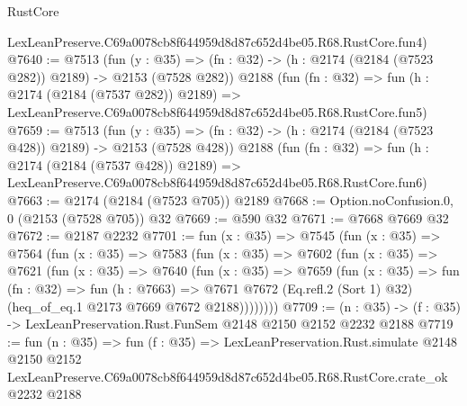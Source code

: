 \begin{lexlean}{RustCore}
\begin{coremodule}
    LexLeanPreserve.C69a0078cb8f644959d8d87c652d4be05.R68.RustCore.fun4)
@7640 := @7513
    (fun (y : @35) => (fn : @32) -> (h : @2174 (@2184 (@7523 @282)) @2189) -> @2153 (@7528 @282))
    @2188
    (fun (fn : @32) =>
    fun (h : @2174 (@2184 (@7537 @282)) @2189) =>
    LexLeanPreserve.C69a0078cb8f644959d8d87c652d4be05.R68.RustCore.fun5)
@7659 := @7513
    (fun (y : @35) => (fn : @32) -> (h : @2174 (@2184 (@7523 @428)) @2189) -> @2153 (@7528 @428))
    @2188
    (fun (fn : @32) =>
    fun (h : @2174 (@2184 (@7537 @428)) @2189) =>
    LexLeanPreserve.C69a0078cb8f644959d8d87c652d4be05.R68.RustCore.fun6)
@7663 := @2174 (@2184 (@7523 @705)) @2189
@7668 := Option.noConfusion.{0, 0} (@2153 (@7528 @705)) @32
@7669 := @590 @32
@7671 := @7668 @7669 @32
@7672 := @2187 @2232
@7701 := fun (x : @35) =>
  @7545
    (fun (x : @35) =>
    @7564
      (fun (x : @35) =>
      @7583
        (fun (x : @35) =>
        @7602
          (fun (x : @35) =>
          @7621
            (fun (x : @35) =>
            @7640
              (fun (x : @35) =>
              @7659
                (fun (x : @35) =>
                fun (fn : @32) =>
                fun (h : @7663) =>
                @7671
                  @7672
                  (Eq.refl.{2} (Sort 1) @32)
                  (heq_of_eq.{1} @2173 @7669 @7672 @2188))))))))
@7709 := (n : @35) -> (f : @35) -> LexLeanPreservation.Rust.FunSem @2148 @2150 @2152 @2232 @2188
@7719 := fun (n : @35) =>
  fun (f : @35) =>
  LexLeanPreservation.Rust.simulate
    @2148
    @2150
    @2152
    LexLeanPreserve.C69a0078cb8f644959d8d87c652d4be05.R68.RustCore.crate_ok
    @2232
    @2188
\end{coremodule}
\end{lexlean}
